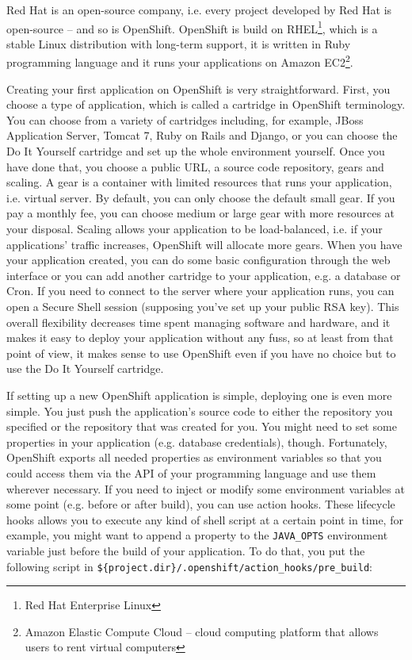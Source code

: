 Red Hat is an open-source company, i.e. every project developed by Red Hat is open-source -- and so is OpenShift. OpenShift is build on RHEL\footnote{Red Hat Enterprise Linux}, which is a stable Linux distribution with long-term support, it is written in Ruby programming language and it runs your applications on Amazon EC2\footnote{Amazon Elastic Compute Cloud -- cloud computing platform that allows users to rent virtual computers}.

Creating your first application on OpenShift is very straightforward. First, you choose a type of application, which is called a cartridge in OpenShift terminology. You can choose from a variety of cartridges including, for example, JBoss Application Server, Tomcat 7, Ruby on Rails and Django, or you can choose the Do It Yourself cartridge and set up the whole environment yourself. Once you have done that, you choose a public URL, a source code repository, gears and scaling. A gear is a container with limited resources that runs your application, i.e. virtual server. By default, you can only choose the default small gear. If you pay a monthly fee, you can choose medium or large gear with more resources at your disposal. Scaling allows your application to be load-balanced, i.e. if your applications' traffic increases, OpenShift will allocate more gears. When you have your application created, you can do some basic configuration through the web interface or you can add another cartridge to your application, e.g. a database or Cron. If you need to connect to the server where your application runs, you can open a Secure Shell session (supposing you've set up your public RSA key). This overall flexibility decreases time spent managing software and hardware, and it makes it easy to deploy your application without any fuss, so at least from that point of view, it makes sense to use OpenShift even if you have no choice but to use the Do It Yourself cartridge.

If setting up a new OpenShift application is simple, deploying one is even more simple. You just push the application's source code to either the repository you specified or the repository that was created for you. You might need to set some properties in your application (e.g. database credentials), though. Fortunately, OpenShift exports all needed properties as environment variables so that you could access them via the API of your programming language and use them wherever necessary. If you need to inject or modify some environment variables at some point (e.g. before or after build), you can use action hooks. These lifecycle hooks allows you to execute any kind of shell script at a certain point in time, for example, you might want to append a property to the \texttt{JAVA\_OPTS} environment variable just before the build of your application. To do that, you put the following script in \texttt{\$\{project.dir\}/.openshift/action\_hooks/pre\_build}:

